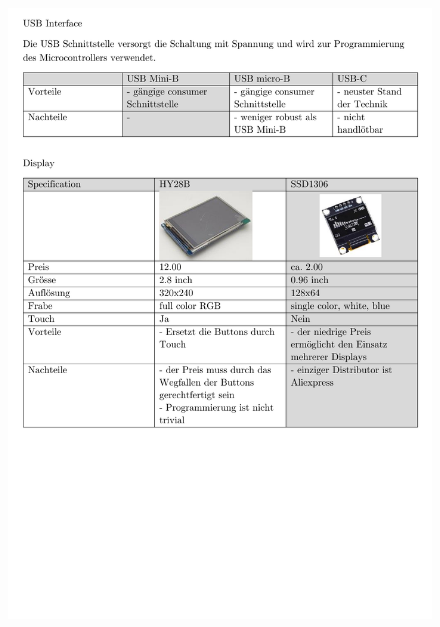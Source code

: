 \begin{appendix}
\begin{figure}[h]
	\centering
	\includegraphics[width=0.95\linewidth]{appendix/pflichtenheft (4).pdf}
\end{figure}


\end{appendix}
